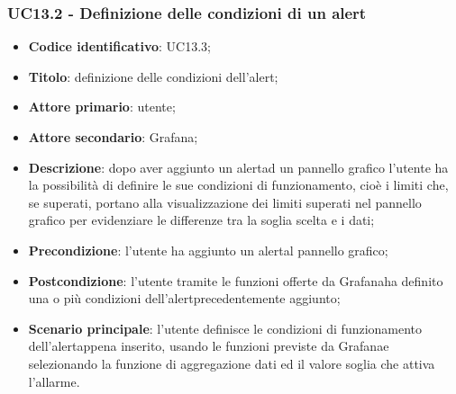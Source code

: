 \subsubsection{UC13.2 - Definizione delle condizioni di un alert}
\begin{itemize}
	\item \textbf{Codice identificativo}: UC13.3;
	\item \textbf{Titolo}: definizione delle condizioni dell'alert\glo;
	\item \textbf{Attore primario}: utente;
	\item \textbf{Attore secondario}: Grafana\glo;
	\item \textbf{Descrizione}: dopo aver aggiunto un alert\glosp ad un pannello grafico l'utente ha la possibilità di definire le sue condizioni di funzionamento, cioè i limiti che, se superati, portano alla visualizzazione dei limiti superati nel pannello grafico per evidenziare le differenze tra la soglia scelta e i dati;
	\item \textbf{Precondizione}: l'utente ha aggiunto un alert\glosp al pannello grafico;
	\item \textbf{Postcondizione}: l'utente tramite le funzioni offerte da Grafana\glosp ha definito una o più condizioni dell'alert\glosp precedentemente aggiunto;
	\item \textbf{Scenario principale}: l'utente definisce le condizioni di funzionamento dell'alert\glosp appena inserito, usando le funzioni previste da Grafana\glosp e selezionando la funzione di aggregazione dati ed il valore soglia che attiva l'allarme.
\end{itemize}

